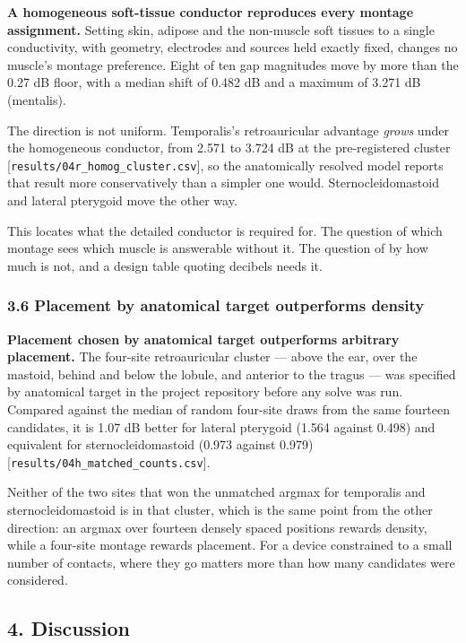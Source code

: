 \documentclass[
  11pt,
  letterpaper,
]{article}
\begin{document}
\textbf{A homogeneous soft-tissue conductor reproduces every montage assignment.}
Setting skin, adipose and the non-muscle soft tissues to a single conductivity,
with geometry, electrodes and sources held exactly fixed, changes no muscle's
montage preference. Eight of ten gap magnitudes move by more than the 0.27 dB
floor, with a median shift of 0.482 dB and a maximum of 3.271 dB (mentalis).

The direction is not uniform. Temporalis's retroauricular advantage \emph{grows}
under the homogeneous conductor, from \textminus{}2.571 to \textminus{}3.724 dB at the pre-registered
cluster {[}\texttt{results/04r\_homog\_cluster.csv}{]}, so the anatomically resolved model
reports that result more conservatively than a simpler one would.
Sternocleidomastoid and lateral pterygoid move the other way.

This locates what the detailed conductor is required for. The question of
which montage sees which muscle is answerable without it. The question of by
how much is not, and a design table quoting decibels needs it.

\subsubsection{3.6 Placement by anatomical target outperforms density}\label{placement-by-anatomical-target-outperforms-density}

\textbf{Placement chosen by anatomical target outperforms arbitrary placement.} The
four-site retroauricular cluster --- above the ear, over the mastoid, behind and
below the lobule, and anterior to the tragus --- was specified by anatomical
target in the project repository before any solve was run. Compared against
the median of random four-site draws from the same fourteen candidates, it is
1.07 dB better for lateral pterygoid (\textminus{}1.564 against \textminus{}0.498) and equivalent
for sternocleidomastoid (\textminus{}0.973 against \textminus{}0.979)
{[}\texttt{results/04h\_matched\_counts.csv}{]}.

Neither of the two sites that won the unmatched argmax for temporalis and
sternocleidomastoid is in that cluster, which is the same point from the other
direction: an argmax over fourteen densely spaced positions rewards density,
while a four-site montage rewards placement. For a device constrained to a
small number of contacts, where they go matters more than how many candidates
were considered.

\subsection{4. Discussion}\label{discussion}
\end{document}
